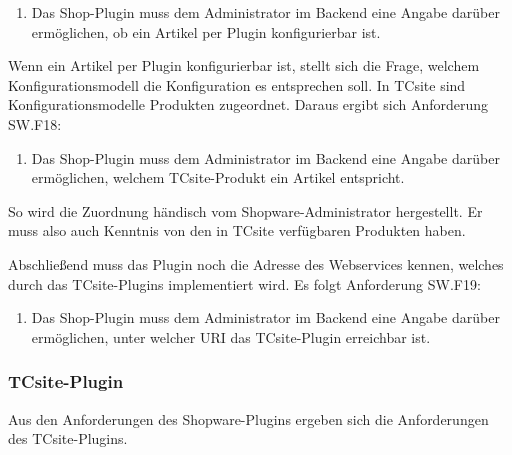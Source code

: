 \documentclass[12pt,a4paper,bibliography=totocnumbered,listof=totoc]{scrartcl}
\begin{document}
\begin{enumerate}[SW.F17:]\bfseries
\item Das Shop-Plugin muss dem Administrator im Backend eine Angabe darüber ermöglichen, ob ein Artikel per Plugin konfigurierbar ist.
\end{enumerate}
Wenn ein Artikel per Plugin konfigurierbar ist, stellt sich die Frage, welchem Konfigurationsmodell die Konfiguration es entsprechen soll. In TCsite sind Konfigurationsmodelle Produkten zugeordnet. Daraus ergibt sich Anforderung SW.F18:
\begin{enumerate}[SW.F18:]\bfseries
\item Das Shop-Plugin muss dem Administrator im Backend eine Angabe darüber ermöglichen, welchem TCsite-Produkt ein Artikel entspricht.
\end{enumerate}
So wird die Zuordnung händisch vom Shopware-Administrator hergestellt. Er muss also auch Kenntnis von den in TCsite verfügbaren Produkten haben.

Abschließend muss das Plugin noch die Adresse des Webservices kennen, welches durch das TCsite-Plugins implementiert wird. Es folgt Anforderung SW.F19:
\begin{enumerate}[SW.F19:]\bfseries
\item Das Shop-Plugin muss dem Administrator im Backend eine Angabe darüber ermöglichen, unter welcher URI das TCsite-Plugin erreichbar ist.
\end{enumerate}

\subsubsection{TCsite-Plugin}
Aus den Anforderungen des Shopware-Plugins ergeben sich die Anforderungen des TCsite-Plugins.
\end{document}
